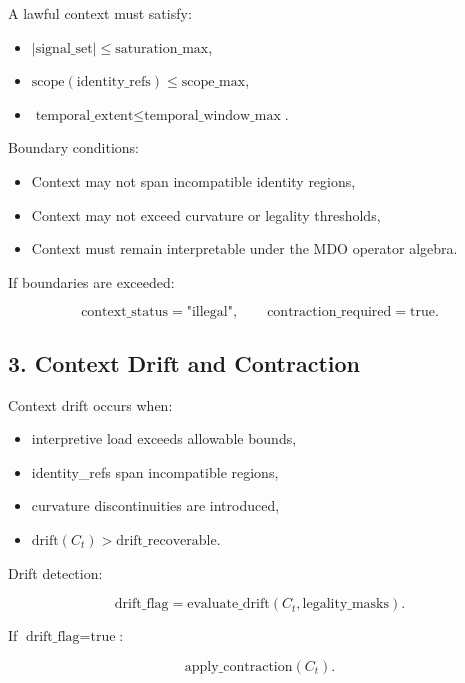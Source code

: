 A lawful context must satisfy:
\begin{itemize}[leftmargin=1.2cm]
    \item $|\text{signal\_set}| \leq \text{saturation\_max}$,
    \item $\text{scope}(\text{identity\_refs}) \leq \text{scope\_max}$,
    \item $\text{temporal\_extent} \leq \text{temporal\_window\_max}$.
\end{itemize}

Boundary conditions:
\begin{itemize}[leftmargin=1.2cm]
    \item Context may not span incompatible identity regions,
    \item Context may not exceed curvature or legality thresholds,
    \item Context must remain interpretable under the MDO operator algebra.
\end{itemize}

If boundaries are exceeded:



\[
\text{context\_status} = \text{"illegal"}, \qquad
\text{contraction\_required} = \text{true}.
\]



\subsection*{3. Context Drift and Contraction}
\label{boot:cwg_drift_contraction}

Context drift occurs when:
\begin{itemize}[leftmargin=1.2cm]
    \item interpretive load exceeds allowable bounds,
    \item identity\_refs span incompatible regions,
    \item curvature discontinuities are introduced,
    \item $\text{drift}(C_t) > \text{drift\_recoverable}$.
\end{itemize}

Drift detection:



\[
\text{drift\_flag} = \text{evaluate\_drift}(C_t, \text{legality\_masks}).
\]



If $\text{drift\_flag} = \text{true}$:



\[
\text{apply\_contraction}(C_t).
\]



